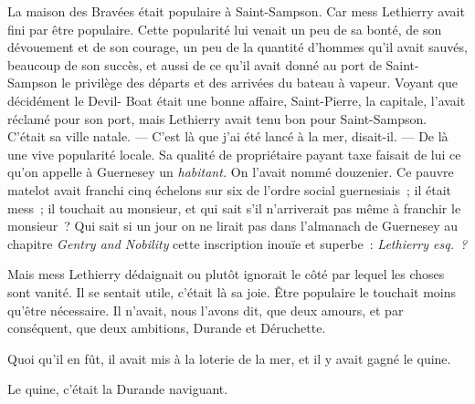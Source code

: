\documentclass[french,twoside]{book} %
\begin{document}
La maison des Bravées était populaire à Saint-Sampson. Car mess Lethierry avait fini par être populaire. Cette popularité lui venait un peu de sa bonté, de son dévouement et de son courage, un peu de la quantité d’hommes qu’il avait sauvés, beaucoup de son succès, et aussi de ce qu’il avait donné au port de Saint-Sampson le privilège des départs et des arrivées du bateau à vapeur. Voyant que décidément le Devil- Boat était une bonne affaire, Saint-Pierre, la capitale, l’avait réclamé pour son port, mais Lethierry avait tenu bon pour Saint-Sampson. C’était sa ville natale. — C’est là que j’ai été lancé à la mer, disait-il. — De là une vive popularité locale. Sa qualité de propriétaire payant taxe faisait de lui ce qu’on appelle à Guernesey un \emph{habitant.} On l’avait nommé douzenier. Ce pauvre matelot avait franchi cinq échelons sur six de l’ordre social guernesiais ; il était mess ; il touchait au monsieur, et qui sait s’il n’arriverait pas même à franchir le monsieur ? Qui sait si un jour on ne lirait pas dans l’almanach de Guernesey au chapitre \emph{Gentry and Nobility} cette inscription inouïe et superbe : \emph{Lethierry esq. ?}\par
Mais mess Lethierry dédaignait ou plutôt ignorait le côté par lequel les choses sont vanité. Il se sentait utile, c’était là sa joie. Être populaire le touchait moins qu’être nécessaire. Il n’avait, nous l’avons dit, que deux amours, et par conséquent, que deux ambitions, Durande et Déruchette.\par
Quoi qu’il en fût, il avait mis à la loterie de la mer, et il y avait gagné le quine.\par
Le quine, c’était la Durande naviguant.
\end{document}
